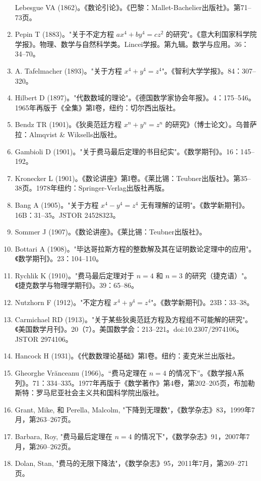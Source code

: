 \begin{enumerate}
Lebesgue VA (1862)。《数论引论》。《巴黎：Mallet-Bachelier出版社》。第71–73页。  
\item Pepin T (1883)。"关于不定方程 \( ax^4 + by^4 = cz^2 \) 的研究"。《意大利国家科学院学报》。物理、数学与自然科学类。Lincei学报。第九辑。数学与应用。36：34–70。  
\item A. Tafelmacher (1893)。"关于方程 \( x^4 + y^4 = z^4 \)"。《智利大学学报》。84：307–320。  
\item Hilbert D (1897)。"代数数域的理论"。《德国数学家协会年报》。4：175–546。1965年再版于《全集》第I卷，纽约：切尔西出版社。  
\item Bendz TR (1901)。《狄奥范廷方程 \( x^n + y^n = z^n \) 的研究》（博士论文）。乌普萨拉：Almqvist & Wiksells出版社。  
\item Gambioli D (1901)。"关于费马最后定理的书目纪实"。《数学期刊》。16：145–192。  
\item Kronecker L (1901)。《数论讲座》第I卷。《莱比锡：Teubner出版社》。第35–38页。1978年纽约：Springer-Verlag出版社再版。  
\item Bang A (1905)。"关于方程 \( x^4 - y^4 = z^4 \) 无有理解的证明"。《数学新期刊》。16B：31–35。JSTOR 24528323。  
\item Sommer J (1907)。《数论讲座》。《莱比锡：Teubner出版社》。  
\item Bottari A (1908)。"毕达哥拉斯方程的整数解及其在证明数论定理中的应用"。《数学期刊》。23：104–110。  
\item Rychlik K (1910)。"费马最后定理对于 \( n = 4 \) 和 \( n = 3 \) 的研究（捷克语）"。《捷克数学与物理学期刊》。39：65–86。  
\item Nutzhorn F (1912)。"不定方程 \( x^4 + y^4 = z^4 \)"。《数学新期刊》。23B：33–38。  
\item Carmichael RD (1913)。"关于某些狄奥范廷方程及方程组不可能解的研究"。《美国数学月刊》。20（7）。美国数学会：213–221。doi:10.2307/2974106。JSTOR 2974106。  
\item Hancock H (1931)。《代数数理论基础》第I卷。纽约：麦克米兰出版社。
\item Gheorghe Vrănceanu (1966)。“费马定理在 \( n = 4 \) 的情况下”。《数学报A系列》。71：334–335。1977年再版于《数学著作》第4卷，第202–205页，布加勒斯特：罗马尼亚社会主义共和国科学院出版社。  
\item Grant, Mike, 和 Perella, Malcolm, "下降到无理数"，《数学杂志》83，1999年7月，第263–267页。  
\item Barbara, Roy, "费马最后定理在 \( n = 4 \) 的情况下"，《数学杂志》91，2007年7月，第260–262页。  
\item Dolan, Stan, "费马的无限下降法"，《数学杂志》95，2011年7月，第269–271页。  

\end{enumerate}
